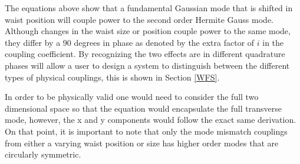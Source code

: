 		The equations above show that a fundamental Gaussian mode that is shifted in waist position will couple power to the second order Hermite Gauss mode.  Although changes in the waist size or position couple power to the same mode, they differ by a 90 degrees in phase as denoted by the extra factor of $i$ in the coupling coefficient.  By recognizing the two effects are in different quadrature phases will allow a user to design a system to distinguish between the different types of physical couplings, this is shown in Section \ref{WFS}.
		
		 In order to be physically valid one would need to consider the full two dimensional space so that the equation would encapsulate the full transverse mode, however, the x and y components would follow the exact same derivation. On that point, it is important to note that only the mode mismatch couplings from either a varying waist position or size has higher order modes that are circularly symmetric.
		
